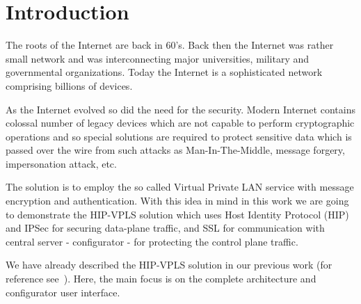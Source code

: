 \chapter{Introduction}

The roots of the Internet are back in 60's. Back then the Internet was rather 
small network and was interconnecting major universities, military and governmental
organizations. Today the Internet is a sophisticated network comprising billions 
of devices. 

As the Internet evolved so did the need for the security. Modern Internet 
contains colossal number of legacy devices which are not capable to perform 
cryptographic operations and so special solutions are required to protect 
sensitive data which is passed over the wire from such attacks as 
Man-In-The-Middle, message forgery, impersonation attack, etc.

The solution is to employ the so called Virtual Private LAN service with message
encryption and authentication. With this idea in mind in this work we are going 
to demonstrate the HIP-VPLS solution which uses Host Identity Protocol (HIP)
and IPSec for securing data-plane traffic, and SSL for communication with 
central server - configurator - for protecting the control plane traffic. 

We have already described the HIP-VPLS solution in our previous work (for reference
see~\cite{}). Here, the main focus is on the complete architecture and configurator
user interface.